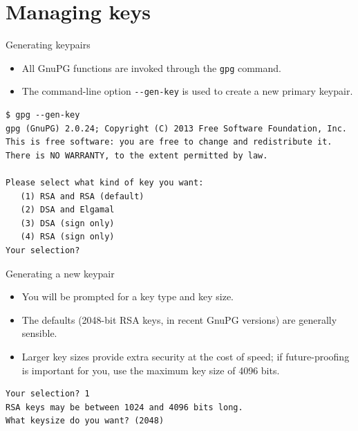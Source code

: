 \documentclass[
mode=present,
paper=smartboard,
size=20pt,
]{powerdot}
\newcommand{\clopt}[1]{\texttt{{-}#1}}
\begin{document}
\section{Managing keys}

\begin{slide}[method=direct]{Generating keypairs}
  \begin{itemize}
  \item All GnuPG functions are invoked through the \texttt{gpg} command.
  \item The command-line option \clopt{-gen-key} is used to create a new
  primary keypair.
  \end{itemize}
\begin{verbatim}
$ gpg --gen-key
gpg (GnuPG) 2.0.24; Copyright (C) 2013 Free Software Foundation, Inc.
This is free software: you are free to change and redistribute it.
There is NO WARRANTY, to the extent permitted by law.

Please select what kind of key you want:
   (1) RSA and RSA (default)
   (2) DSA and Elgamal
   (3) DSA (sign only)
   (4) RSA (sign only)
Your selection?
\end{verbatim}
\end{slide}

\begin{slide}[method=direct,toc=]{Generating a new keypair}
  \begin{itemize}
  \item You will be prompted for a key type and key size.
  \item The defaults (2048-bit RSA keys, in recent GnuPG versions) are
    generally sensible.
  \item Larger key sizes provide extra security at the cost of speed;
    if future-proofing is important for you, use the maximum key size
    of 4096 bits.
  \end{itemize}
\begin{verbatim}
Your selection? 1
RSA keys may be between 1024 and 4096 bits long.
What keysize do you want? (2048)
\end{verbatim}
\end{slide}
\end{document}
